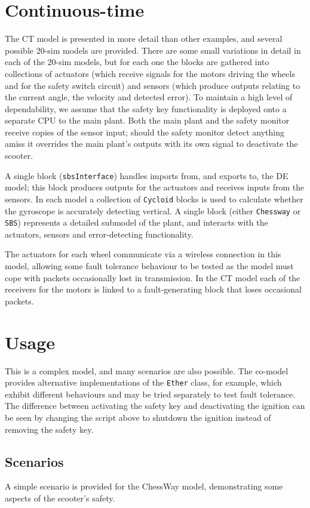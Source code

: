 \section{Continuous-time} The CT model is presented in more
detail than other examples, and several possible 20-sim models
are provided. There are some small variations in detail in each
of the 20-sim models, but for each one the blocks are gathered
into collections of actuators (which receive signals for the
motors driving the wheels and for the safety switch circuit) and
sensors (which produce outputs relating to the current angle,
the velocity and detected error). To maintain a high level of
dependability, we assume that the safety key functionality is
deployed onto a separate CPU to the main plant. Both the main
plant and the safety monitor receive copies of the sensor input;
should the safety monitor detect anything amiss it overrides the
main plant's outputs with its own signal to deactivate the
scooter.

A single block (\texttt{sbsInterface}) handles imports from, and
exports to, the DE model; this block produces outputs for the actuators and
receives inputs from the sensors. In each model a collection of
\texttt{Cycloid} blocks is used to calculate whether the
gyroscope is accurately detecting vertical. A single block
(either \texttt{Chessway} or \texttt{SBS}) represents a detailed
submodel of the plant, and interacts with the actuators, sensors
and error-detecting functionality.

The actuators for each wheel communicate via a wireless
connection in this model, allowing some fault tolerance
behaviour to be tested as the model must cope with packets
occasionally lost in transmission. In the CT model each of the
receivers for the motors is linked to a fault-generating block
that loses occasional packets.

\section{Usage}
This is a complex model, and many scenarios are also possible.  The
\DESTECS co-model provides alternative implementations of the
\texttt{Ether} class, for example, which exhibit different behaviours
and may be tried separately to test fault tolerance.  The difference
between activating the safety key and deactivating the ignition can be
seen by changing the script above to shutdown the ignition instead of
removing the safety key.

\subsection{Scenarios}
A simple scenario is provided for the
ChessWay \DESTECS model, demonstrating some aspects of the
scooter's safety.

